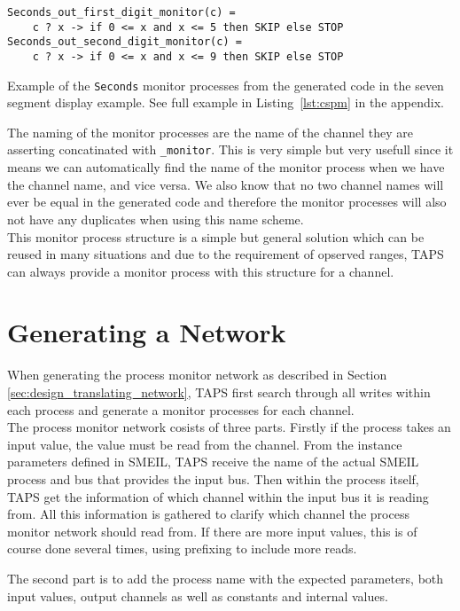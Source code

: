 \begin{listing}
\begin{verbatim}
Seconds_out_first_digit_monitor(c) =
    c ? x -> if 0 <= x and x <= 5 then SKIP else STOP
Seconds_out_second_digit_monitor(c) =
    c ? x -> if 0 <= x and x <= 9 then SKIP else STOP
\end{verbatim}
\caption{Example of the \texttt{Seconds} monitor processes from the generated \cspm{} code in the seven segment display example. See full example in Listing~\ref{lst:cspm} in the appendix.}
\label{lst:monitor_range_cspm}
\end{listing}
The naming of the monitor processes are the name of the channel they are asserting concatinated with \texttt{\_monitor}. This is very simple but very usefull since it means we can automatically find the name of the monitor process when we have the channel name, and vice versa. We also know that no two channel names will ever be equal in the generated \cspm{} code and therefore the monitor processes will also not have any duplicates when using this name scheme. \\

This monitor process structure is a simple but general solution which can be reused in many situations and due to the requirement of opserved ranges, TAPS can always provide a monitor process with this structure for a channel.
\section{Generating a \cspm{} Network}
When generating the process monitor network as described in Section \ref{sec:design_translating_network}, TAPS first search through all writes within each process and generate a monitor processes for each channel.\\

The process monitor network cosists of three parts. Firstly if the process takes an input value, the value must be read from the channel. From the instance parameters defined in SMEIL, TAPS receive the name of the actual SMEIL process and bus that provides the input bus. Then within the process itself, TAPS get the information of which channel within the input bus it is reading from. All this information is gathered to clarify which \cspm{} channel the process monitor network should read from. If there are more input values, this is of course done several times, using prefixing to include more reads.

The second part is to add the process name with the expected parameters, both input values, output channels as well as constants and internal values.

